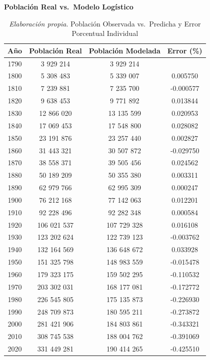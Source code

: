 \documentclass[12pt]{article}
\begin{document}
\begin{table}[ht]
  \centering
  \textbf{Población Real vs.\ Modelo Logístico}\\
  \vspace{0.4cm}
  \begin{tabular}{cccc}
    \toprule
    Año & Población Real & Población Modelada & Error (\%) \\
    \midrule
    1790 & 3 929 214   & 3 929 214   &          \\
    1800 & 5 308 483   & 5 339 007   &  0.005750 \\
    1810 & 7 239 881   & 7 235 700   & -0.000577 \\
    1820 & 9 638 453   & 9 771 892   &  0.013844 \\
    1830 &12 866 020   &13 135 599   &  0.020953 \\
    1840 &17 069 453   &17 548 800   &  0.028082 \\
    1850 &23 191 876   &23 257 440   &  0.002827 \\
    1860 &31 443 321   &30 507 872   & -0.029750 \\
    1870 &38 558 371   &39 505 456   &  0.024562 \\
    1880 &50 189 209   &50 355 380   &  0.003311 \\
    1890 &62 979 766   &62 995 309   &  0.000247 \\
    1900 &76 212 168   &77 142 063   &  0.012201 \\
    1910 &92 228 496   &92 282 348   &  0.000584 \\
    1920 &106 021 537  &107 729 328  &  0.016108 \\
    1930 &123 202 624  &122 739 123  & -0.003762 \\
    1940 &132 164 569  &136 648 672  &  0.033928 \\
    1950 &151 325 798  &148 983 559  & -0.015478 \\
    1960 &179 323 175  &159 502 295  & -0.110532 \\
    1970 &203 302 031  &168 177 081  & -0.172772 \\
    1980 &226 545 805  &175 135 873  & -0.226930 \\
    1990 &248 709 873  &180 595 211  & -0.273872 \\
    2000 &281 421 906  &184 803 861  & -0.343321 \\
    2010 &308 745 538  &188 004 762  & -0.391069 \\
    2020 &331 449 281  &190 414 265  & -0.425510 \\
    \bottomrule
  \end{tabular}
  \caption{\textit{Elaboración propia}. Población Observada vs.\ Predicha y Error Porcentual Individual}
  \label{tab:2}
\end{table}
\end{document}
